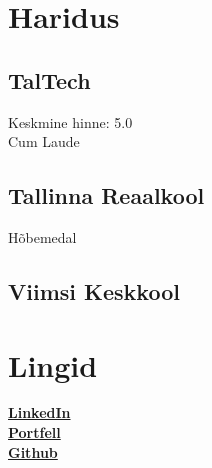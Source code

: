 \documentclass[letterpaper]{deedy-resume} %
\begin{document}
\begin{minipage}[t]{0.33\textwidth} %


\section{Haridus}

\subsection{TalTech}


\sectionspace %

Keskmine hinne: 5.0 \\
Cum Laude


\sectionspace %

\subsection{Tallinna Reaalkool}

Hõbemedal

\sectionspace %

\subsection{Viimsi Keskkool}

\sectionspace %


\section{Lingid}

\href{https://www.linkedin.com/in/evo-annus-094362231/}{\bf LinkedIn} \\
\href{https://susiik.github.io/}{\bf Portfell} \\
\href{https://github.com/susIik}{\bf Github} \\


\end{minipage}
\end{document}
